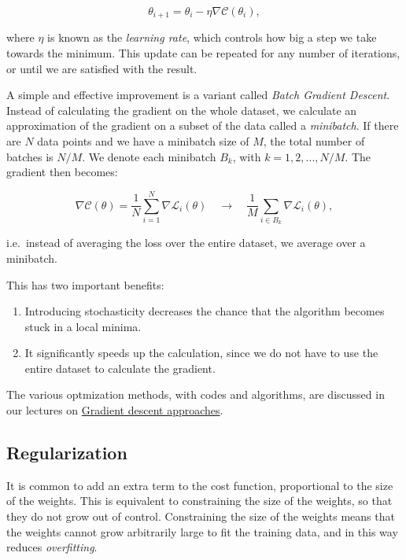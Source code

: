 \documentclass[%
oneside,                 %
final,                   %
10pt]{article}
\begin{document}
$$ \theta_{i+1} = \theta_i - \eta \nabla \mathcal{C}(\theta_i) ,$$

where $\eta$ is known as the \emph{learning rate}, which controls how big a step we take towards the minimum.  
This update can be repeated for any number of iterations, or until we are satisfied with the result.  

A simple and effective improvement is a variant called \emph{Batch Gradient Descent}.  
Instead of calculating the gradient on the whole dataset, we calculate an approximation of the gradient
on a subset of the data called a \emph{minibatch}.  
If there are $N$ data points and we have a minibatch size of $M$, the total number of batches
is $N/M$.  
We denote each minibatch $B_k$, with $k = 1, 2,...,N/M$. The gradient then becomes:  

$$ \nabla \mathcal{C}(\theta) = \frac{1}{N} \sum_{i=1}^N \nabla \mathcal{L}_i(\theta) \quad \rightarrow \quad
\frac{1}{M} \sum_{i \in B_k} \nabla \mathcal{L}_i(\theta) ,$$

i.e.~instead of averaging the loss over the entire dataset, we average over a minibatch.  

This has two important benefits:  
\begin{enumerate}
\item Introducing stochasticity decreases the chance that the algorithm becomes stuck in a local minima.  

\item It significantly speeds up the calculation, since we do not have to use the entire dataset to calculate the gradient.  
\end{enumerate}

\noindent
The various optmization  methods, with codes and algorithms,  are discussed in our lectures on \href{{https://compphysics.github.io/MachineLearning/doc/pub/Splines/html/Splines-bs.html}}{Gradient descent approaches}.

\subsection*{Regularization}

It is common to add an extra term to the cost function, proportional
to the size of the weights.  This is equivalent to constraining the
size of the weights, so that they do not grow out of control.
Constraining the size of the weights means that the weights cannot
grow arbitrarily large to fit the training data, and in this way
reduces \emph{overfitting}.
\end{document}
